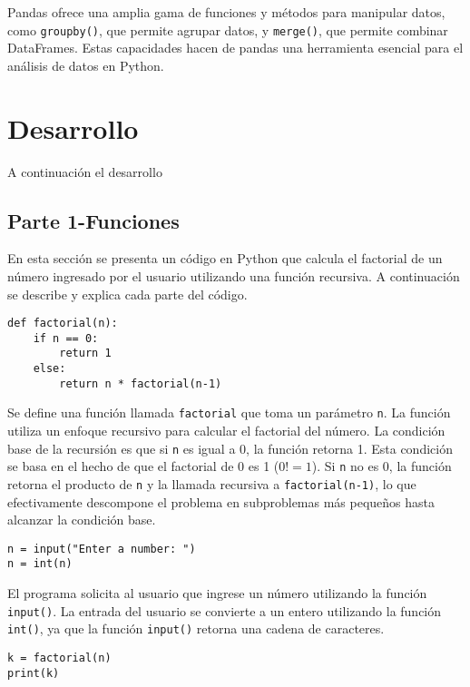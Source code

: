 \documentclass[conference]{IEEEtran}
\begin{document}
Pandas ofrece una amplia gama de funciones y métodos para manipular datos, como \texttt{groupby()}, que permite agrupar datos, y \texttt{merge()}, que permite combinar DataFrames. Estas capacidades hacen de pandas una herramienta esencial para el análisis de datos en Python.


\section{Desarrollo}

A continuación el desarrollo

\subsection{Parte 1-Funciones}

En esta sección se presenta un código en Python que calcula el factorial de un número ingresado por el usuario utilizando una función recursiva. A continuación se describe y explica cada parte del código.

\begin{verbatim}
def factorial(n): 
    if n == 0:
        return 1
    else:
        return n * factorial(n-1)
\end{verbatim}

Se define una función llamada \texttt{factorial} que toma un parámetro \texttt{n}. La función utiliza un enfoque recursivo para calcular el factorial del número. La condición base de la recursión es que si \texttt{n} es igual a 0, la función retorna 1. Esta condición se basa en el hecho de que el factorial de 0 es 1 (\(0! = 1\)). Si \texttt{n} no es 0, la función retorna el producto de \texttt{n} y la llamada recursiva a \texttt{factorial(n-1)}, lo que efectivamente descompone el problema en subproblemas más pequeños hasta alcanzar la condición base.

\begin{verbatim}
n = input("Enter a number: ")  
n = int(n)  
\end{verbatim}

El programa solicita al usuario que ingrese un número utilizando la función \texttt{input()}. La entrada del usuario se convierte a un entero utilizando la función \texttt{int()}, ya que la función \texttt{input()} retorna una cadena de caracteres.

\begin{verbatim}
k = factorial(n)  
print(k)  
\end{verbatim}
\end{document}

